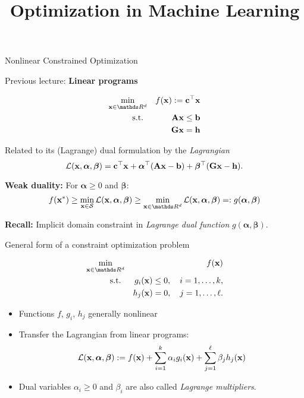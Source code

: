 \documentclass[11pt,compress,t,notes=noshow, xcolor=table]{beamer}
\title{Optimization in Machine Learning}
\date{}
\begin{document}
\lecture{\inserttitle}
\sloppy
\begin{vbframe}{Nonlinear Constrained Optimization}

Previous lecture: \textbf{Linear programs}

\vspace{-\baselineskip}

\begin{eqnarray*}
 \min_{\xv \in \R^d} && f(\xv) := \mathbf{c}^\top\xv \\
\text{s.t. } &&  \Amat \xv \le \mathbf{b}\\
             && \mathbf{G} \xv = \mathbf{h} 
\end{eqnarray*}

Related to its (Lagrange) dual formulation by the \textit{Lagrangian}
\begin{equation*}
    \mathcal{L}(\mathbf{x},\bm{\alpha},\bm{\beta}) = \mathbf{c}^\top \mathbf{x} + \bm{\alpha}^\top (\mathbf{A} \mathbf{x} - \mathbf{b}) + \bm{\beta}^\top (\mathbf{G} \mathbf{x} - \mathbf{h}).
\end{equation*}

\textbf{Weak duality:} For $\bm{\alpha} \geq 0$ and $\bm{\beta}$:
\begin{equation*}
    f(\xv^\ast) \geq \min_{\xv \in \mathcal{S}} \mathcal{L}(\xv, \bm{\alpha}, \bm{\beta}) \geq \min_{\xv \in \R^d} \mathcal{L}(\xv, \bm{\alpha}, \bm{\beta}) =: g(\bm{\alpha}, \bm{\beta})
\end{equation*}

\textbf{Recall:} Implicit domain constraint in \textit{Lagrange dual function} $g(\bm{\alpha}, \bm{\beta})$.

\framebreak

General form of a constraint optimization problem

\vspace{-\baselineskip}

\begin{eqnarray*}
 \min_{\xv \in \R^d} && f(\xv) \\
\text{s.t. } && g_i(\xv) \le 0, \quad i=1,\ldots, k, \\
             && h_j(\xv) = 0, \quad j=1,\ldots, \ell.
\end{eqnarray*}

\begin{itemize}
    \item Functions $f$, $g_i$, $h_j$ generally nonlinear
    \item Transfer the Lagrangian from linear programs:
        \begin{equation*}
            \mathcal{L}(\mathbf{x}, \bm{\alpha}, \bm{\beta}) := f(\mathbf{x}) + \sum_{i=1}^k \alpha_i g_i(\mathbf{x}) + \sum_{j=1}^\ell \beta_j h_j(\mathbf{x})
        \end{equation*}
    \item Dual variables $\alpha_i \ge 0$ and $\beta_i$ are also called \textit{Lagrange multipliers}.
\end{itemize}

\end{vbframe}
\end{document}
